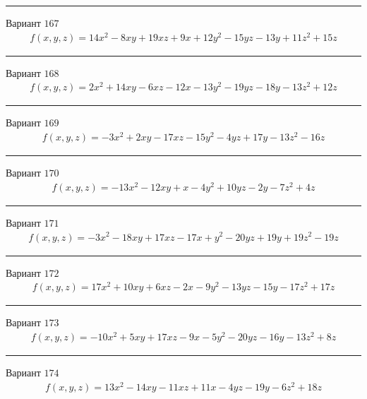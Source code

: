 \documentclass[11pt]{report}
\begin{document}
\begin{center}
\noindent\rule{8cm}{0.4pt}
\end{center}
Вариант $167$
\begin{align*}
    f(x, y, z) = 14 x^{2} - 8 x y + 19 x z + 9 x + 12 y^{2} - 15 y z - 13 y + 11 z^{2} + 15 z
\end{align*}
\begin{center}
\noindent\rule{8cm}{0.4pt}
\end{center}
Вариант $168$
\begin{align*}
    f(x, y, z) = 2 x^{2} + 14 x y - 6 x z - 12 x - 13 y^{2} - 19 y z - 18 y - 13 z^{2} + 12 z
\end{align*}
\begin{center}
\noindent\rule{8cm}{0.4pt}
\end{center}
Вариант $169$
\begin{align*}
    f(x, y, z) = - 3 x^{2} + 2 x y - 17 x z - 15 y^{2} - 4 y z + 17 y - 13 z^{2} - 16 z
\end{align*}
\begin{center}
\noindent\rule{8cm}{0.4pt}
\end{center}
Вариант $170$
\begin{align*}
    f(x, y, z) = - 13 x^{2} - 12 x y + x - 4 y^{2} + 10 y z - 2 y - 7 z^{2} + 4 z
\end{align*}
\begin{center}
\noindent\rule{8cm}{0.4pt}
\end{center}
Вариант $171$
\begin{align*}
    f(x, y, z) = - 3 x^{2} - 18 x y + 17 x z - 17 x + y^{2} - 20 y z + 19 y + 19 z^{2} - 19 z
\end{align*}
\begin{center}
\noindent\rule{8cm}{0.4pt}
\end{center}
Вариант $172$
\begin{align*}
    f(x, y, z) = 17 x^{2} + 10 x y + 6 x z - 2 x - 9 y^{2} - 13 y z - 15 y - 17 z^{2} + 17 z
\end{align*}
\begin{center}
\noindent\rule{8cm}{0.4pt}
\end{center}
Вариант $173$
\begin{align*}
    f(x, y, z) = - 10 x^{2} + 5 x y + 17 x z - 9 x - 5 y^{2} - 20 y z - 16 y - 13 z^{2} + 8 z
\end{align*}
\begin{center}
\noindent\rule{8cm}{0.4pt}
\end{center}
Вариант $174$
\begin{align*}
    f(x, y, z) = 13 x^{2} - 14 x y - 11 x z + 11 x - 4 y z - 19 y - 6 z^{2} + 18 z
\end{align*}
\end{document}
